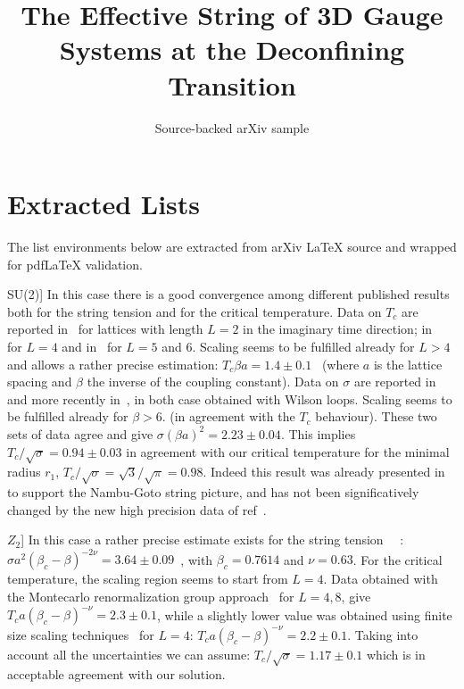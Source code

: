 \documentclass[11pt]{article}
\title{The Effective String of 3D Gauge Systems at the Deconfining Transition}
\author{Source-backed arXiv sample}
\date{}
\begin{document}
\maketitle
\section{Extracted Lists}

The list environments below are extracted from arXiv LaTeX source and wrapped for pdfLaTeX validation.

\begin{description}
\item{SU(2)]}
 In this case there is a good convergence among different published
results both for the string tension and for the critical temperature.
Data on $T_c$ are reported in~\cite{tc1} for lattices with length $L=2$
in
the imaginary time direction; in~\cite{tc2} for $L=4$ and in~\cite{tc3}
for $L=5$ and 6. Scaling seems to be fulfilled already for $L>4$
and allows a rather precise estimation: $T_c\beta a=1.4\pm0.1
$~\cite{tc3} (where $a$ is the lattice spacing and $\beta$ the inverse
of the coupling constant).
Data on $\sigma$ are reported in~\cite{sigma1} and more
recently in~\cite{sigma2}, in both case obtained with Wilson loops.
Scaling seems to be fulfilled already for $\beta>6.$ (in agreement with
the $T_c$ behaviour). These two sets of data agree and
give $\sigma(\beta a)^2=2.23\pm0.04$.  This implies
$T_c/\sqrt{\sigma}=0.94\pm0.03$ in agreement with our critical
temperature for the minimal radius $r_1$,
$T_c/{\sqrt\sigma}={\sqrt3}/{\sqrt\pi}=0.98$.
 Indeed this result was
already presented in~\cite{fp} to support the Nambu-Goto string picture, and
has not been significatively changed by the new high precision data of
ref~\cite{sigma2}.

\item{$Z_2$]}
 In this case a rather precise estimate exists for the string
tension ~\cite{noiz2}~:
$\sigma a^2(\beta_c-\beta)^{-2\nu}=3.64\pm0.09$~, with
$\beta_c=0.7614$ and $\nu=0.63$.
For the critical
temperature, the scaling region seems to start from $L=4$. Data obtained
with the Montecarlo renormalization group approach~\cite{wan2} for
$L=4,8$, give $T_c a(\beta_c-\beta)^{-\nu}
=2.3\pm0.1$, while a slightly lower value was
obtained using finite size scaling techniques~\cite{wan1,brower}
for $L=4$:  $T_c a(\beta_c-\beta)^{-\nu}=2.2\pm0.1$. Taking
into account all the uncertainties we
can assume: $T_c/\sqrt{\sigma}=1.17\pm0.1$ which is in acceptable
agreement with our solution.

\end{description}
\end{document}
